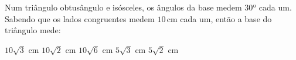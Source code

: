Num tri\^angulo obtus\^angulo e is\'osceles, os \^angulos da base medem $30º$ cada um. Sabendo que os lados congruentes medem $10$\,cm cada um, ent\~ao a base do tri\^angulo mede:

$10\sqrt{3}$ cm
$10\sqrt{2}$ cm
$10\sqrt{6}$ cm
$5\sqrt{3}$ cm
$5\sqrt{2}$ cm



